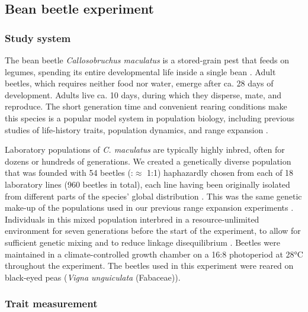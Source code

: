 \subsection{Bean beetle experiment}

\subsubsection{Study system}

The bean beetle \textit{Callosobruchus maculatus} is a stored-grain pest that feeds on legumes, spending its entire developmental life inside a single bean \citep{fujii_behavioral_1990}. Adult beetles, which requires neither food nor water, emerge after ca. 28 days of development. Adults live ca. 10 days, during which they disperse, mate, and reproduce. The short generation time and convenient rearing conditions make this species is a popular model system in population biology, including previous studies of life-history traits, population dynamics, and range expansion \citep{bellows_analytical_1982,fujii_behavioral_1990,miller_confronting_2011,miller_sex_2013,wagner_genetic_2016,ochocki_rapid_2017}.

Laboratory populations of \textit{C. maculatus} are typically highly inbred, often for dozens or hundreds of generations. We created a genetically diverse population that was founded with 54 beetles (\female:\mars $\approx$ 1:1) haphazardly chosen from each of 18 laboratory lines (960 beetles in total), each line having been originally isolated from different parts of the species’ global distribution \citep{downey_comparative_2015}. This was the same genetic make-up of the populations used in our previous range expansion experiments \citep{ochocki_rapid_2017}. Individuals in this mixed population interbred in a resource-unlimited environment for seven generations before the start of the experiment, to allow for sufficient genetic mixing and to reduce linkage disequilibrium \citep{roughgarden_theory_1979,ochocki_rapid_2017}. Beetles were maintained in a climate-controlled growth chamber on a 16:8 photoperiod at 28°C throughout the experiment. The beetles used in this experiment were reared on black-eyed peas (\textit{Vigna unguiculata} (Fabaceae)). %

\subsubsection{Trait measurement}
